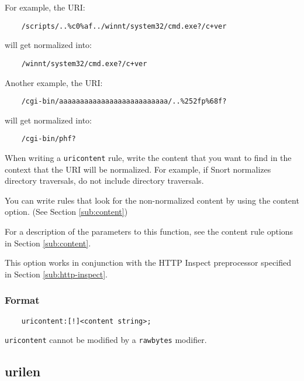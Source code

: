 \documentclass[english]{report}
\newenvironment{note}{
\samepage
    \vspace{10pt}{\textsf{
        {\hspace{7pt}\Huge{$\triangle$\hspace{-12.5pt}{\Large{$^!$}}}}\hspace{5pt}
        {\Large{NOTE}}
    }
    }
   \begin{center}
    \par\vspace{-17pt}

    \begin{lrbox}{\savepar}
    \begin{minipage}[r]{6in}
}
{
    \end{minipage}
    \end{lrbox}
    \fbox{
        \usebox{
            \savepar
	}
    }
    \par\vskip10pt
    \end{center}
}
\newenvironment{note}{
        \begin{rawhtml}
        <p><table border="1"><tr><td><b>
        Note:&nbsp;&nbsp;</b>
        \end{rawhtml}
}{
        \begin{rawhtml}
        </b></td></tr></table></p>
        \end{rawhtml}
}
\begin{document}
For example, the URI: 

\begin{verbatim}
    /scripts/..%c0%af../winnt/system32/cmd.exe?/c+ver
\end{verbatim}

will get normalized into:

\begin{verbatim}
    /winnt/system32/cmd.exe?/c+ver
\end{verbatim}

Another example, the URI:

\begin{verbatim}
    /cgi-bin/aaaaaaaaaaaaaaaaaaaaaaaaaa/..%252fp%68f?
\end{verbatim}

will get normalized into:

\begin{verbatim}
    /cgi-bin/phf?
\end{verbatim}

When writing a \texttt{uricontent} rule, write the content that you want to
find in the context that the URI will be normalized.  For example, if Snort
normalizes directory traversals, do not include directory traversals.  

You can write rules that look for the non-normalized content by using the
content option.  (See Section \ref{sub:content})

For a description of the parameters to this function, see the content rule
options in Section \ref{sub:content}. 

This option works in conjunction with the HTTP Inspect preprocessor specified
in Section \ref{sub:http-inspect}.

\subsubsection{Format}

\begin{verbatim}
    uricontent:[!]<content string>;
\end{verbatim}

\begin{note}

\texttt{uricontent} cannot be modified by a \texttt{rawbytes} modifier.

\end{note}

\subsection{urilen}
\end{document}
